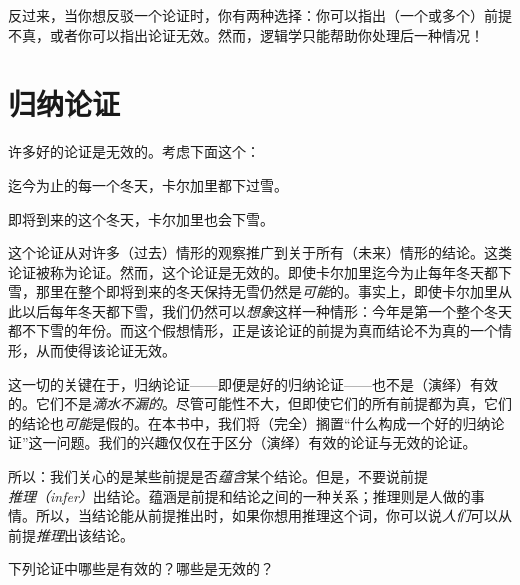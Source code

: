 反过来，当你想反驳一个论证时，你有两种选择：你可以指出（一个或多个）前提不真，或者你可以指出论证无效。然而，逻辑学只能帮助你处理后一种情况！

\section{归纳论证}

许多好的论证是无效的。考虑下面这个：

\begin{earg}
		\item[] 迄今为止的每一个冬天，卡尔加里都下过雪。
	\item[\texttherefore] 即将到来的这个冬天，卡尔加里也会下雪。
\end{earg}

这个论证从对许多（过去）情形的观察推广到关于所有（未来）情形的结论。这类论证被称为论证。然而，这个论证是无效的。即使卡尔加里迄今为止每年冬天都下雪，那里在整个即将到来的冬天保持无雪仍然是\emph{可能}的。事实上，即使卡尔加里从此以后每年冬天都下雪，我们仍然可以\emph{想象}这样一种情形：今年是第一个整个冬天都不下雪的年份。而这个假想情形，正是该论证的前提为真而结论不为真的一个情形，从而使得该论证无效。

这一切的关键在于，归纳论证——即便是好的归纳论证——也不是（演绎）有效的。它们不是\emph{滴水不漏的}。尽管可能性不大，但即使它们的所有前提都为真，它们的结论也\emph{可能}是假的。在本书中，我们将（完全）搁置“什么构成一个好的归纳论证”这一问题。我们的兴趣仅仅在于区分（演绎）有效的论证与无效的论证。

所以：我们关心的是某些前提是否\emph{蕴含}某个结论。但是，不要说前提\emph{推理（infer）}出结论。蕴涵是前提和结论之间的一种关系；推理则是人做的事情。所以，当结论能从前提推出时，如果你想用推理这个词，你可以说\emph{人们}可以从前提\emph{推理}出该结论。

\practiceproblems
\problempart
下列论证中哪些是有效的？哪些是无效的？

